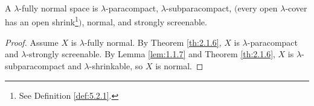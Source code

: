 \documentclass[main.tex]{subfiles}
\begin{document}
{\corollary{} \label{cor:2.1.8}
	A $\lambda$-fully normal space is $\lambda$-paracompact,
	$\lambda$-subparacompact, 
	$($every open $\lambda$-cover 
	has an open shrink\footnote{See Definition \ref{def:5.2.1}.}$)$, normal, and strongly screenable.
}

\begin{proof}
	Assume $X$ is $\lambda$-fully normal. By Theorem \ref{th:2.1.6}, 
	$X$ is $\lambda$-paracompact 
	and $\lambda$-strongly screenable. By Lemma \ref{lem:1.1.7} and 
	Theorem \ref{th:2.1.6}, $X$ is
	$\lambda$-subparacompact and $\lambda$-shrinkable, so $X$ is normal.
\end{proof}




\end{document}
